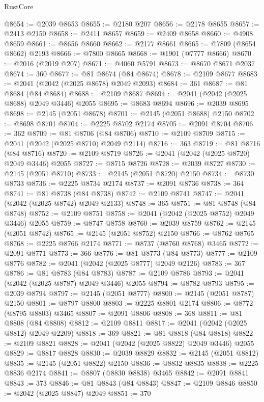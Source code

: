 \begin{lexlean}{RustCore}
\begin{coremodule}
@8654 := @2039 @8653
@8655 := @2180 @207
@8656 := @2178 @8655
@8657 := @2413 @2150
@8658 := @2411 @8657
@8659 := @2409 @8658
@8660 := @4908 @8659
@8661 := @8656 @8660
@8662 := @2177 @8661
@8665 := @7809 (@8654 @8662) @2193
@8666 := @7800 @8665
@8668 := @1901 (@7777 @8666)
@8670 := @2016 (@2019 @207)
@8671 := @4060 @5791
@8673 := @8670 @8671 @2037
@8674 := 360
@8677 := @81 @8674 (@84 @8674)
@8678 := @2109 @8677
@8683 := @2041 (@2042 (@2025 @8678) @2049 @2093)
@8684 := 361
@8687 := @81 @8684 (@84 @8684)
@8688 := @2109 @8687
@8694 := @2041 (@2042 (@2025 @8688) @2049 @3446) @2055
@8695 := @8683 @8694
@8696 := @2039 @8695
@8698 := @2145 (@2051 @8678)
@8701 := @2145 (@2051 @8688) @2150
@8702 := @8698 @8701
@8704 := @2225 @8702 @2174
@8705 := @2091 @8704
@8706 := 362
@8709 := @81 @8706 (@84 @8706)
@8710 := @2109 @8709
@8715 := @2041 (@2042 (@2025 @8710) @2049 @2114)
@8716 := 363
@8719 := @81 @8716 (@84 @8716)
@8720 := @2109 @8719
@8726 := @2041 (@2042 (@2025 @8720) @2049 @3446) @2055
@8727 := @8715 @8726
@8728 := @2039 @8727
@8730 := @2145 (@2051 @8710)
@8733 := @2145 (@2051 @8720) @2150
@8734 := @8730 @8733
@8736 := @2225 @8734 @2174
@8737 := @2091 @8736
@8738 := 364
@8741 := @81 @8738 (@84 @8738)
@8742 := @2109 @8741
@8747 := @2041 (@2042 (@2025 @8742) @2049 @2133)
@8748 := 365
@8751 := @81 @8748 (@84 @8748)
@8752 := @2109 @8751
@8758 := @2041 (@2042 (@2025 @8752) @2049 @3446) @2055
@8759 := @8747 @8758
@8760 := @2039 @8759
@8762 := @2145 (@2051 @8742)
@8765 := @2145 (@2051 @8752) @2150
@8766 := @8762 @8765
@8768 := @2225 @8766 @2174
@8771 := @8737 (@8760 @8768) @3465
@8772 := @2091 @8771
@8773 := 366
@8776 := @81 @8773 (@84 @8773)
@8777 := @2109 @8776
@8782 := @2041 (@2042 (@2025 @8777) @2049 @2126)
@8783 := 367
@8786 := @81 @8783 (@84 @8783)
@8787 := @2109 @8786
@8793 := @2041 (@2042 (@2025 @8787) @2049 @3446) @2055
@8794 := @8782 @8793
@8795 := @2039 @8794
@8797 := @2145 (@2051 @8777)
@8800 := @2145 (@2051 @8787) @2150
@8801 := @8797 @8800
@8803 := @2225 @8801 @2174
@8806 := @8772 (@8795 @8803) @3465
@8807 := @2091 @8806
@8808 := 368
@8811 := @81 @8808 (@84 @8808)
@8812 := @2109 @8811
@8817 := @2041 (@2042 (@2025 @8812) @2049 @2209)
@8818 := 369
@8821 := @81 @8818 (@84 @8818)
@8822 := @2109 @8821
@8828 := @2041 (@2042 (@2025 @8822) @2049 @3446) @2055
@8829 := @8817 @8828
@8830 := @2039 @8829
@8832 := @2145 (@2051 @8812)
@8835 := @2145 (@2051 @8822) @2150
@8836 := @8832 @8835
@8838 := @2225 @8836 @2174
@8841 := @8807 (@8830 @8838) @3465
@8842 := @2091 @8841
@8843 := 373
@8846 := @81 @8843 (@84 @8843)
@8847 := @2109 @8846
@8850 := @2042 (@2025 @8847) @2049
@8851 := 370

\end{coremodule}
\end{lexlean}
